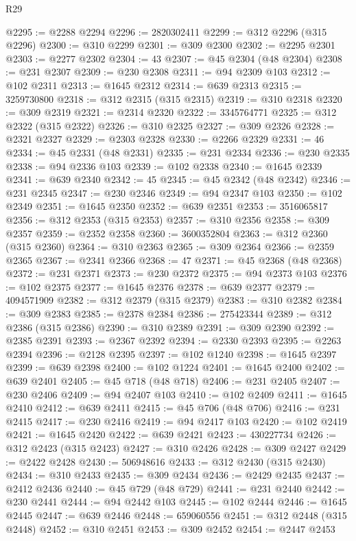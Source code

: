 \begin{lexlean}{R29}
\begin{coremodule}
@2295 := @2288 @2294
@2296 := 2820302411
@2299 := @312 @2296 (@315 @2296)
@2300 := @310 @2299
@2301 := @309 @2300
@2302 := @2295 @2301
@2303 := @2277 @2302
@2304 := 43
@2307 := @45 @2304 (@48 @2304)
@2308 := @231 @2307
@2309 := @230 @2308
@2311 := @94 @2309 @103
@2312 := @102 @2311
@2313 := @1645 @2312
@2314 := @639 @2313
@2315 := 3259730800
@2318 := @312 @2315 (@315 @2315)
@2319 := @310 @2318
@2320 := @309 @2319
@2321 := @2314 @2320
@2322 := 3345764771
@2325 := @312 @2322 (@315 @2322)
@2326 := @310 @2325
@2327 := @309 @2326
@2328 := @2321 @2327
@2329 := @2303 @2328
@2330 := @2266 @2329
@2331 := 46
@2334 := @45 @2331 (@48 @2331)
@2335 := @231 @2334
@2336 := @230 @2335
@2338 := @94 @2336 @103
@2339 := @102 @2338
@2340 := @1645 @2339
@2341 := @639 @2340
@2342 := 45
@2345 := @45 @2342 (@48 @2342)
@2346 := @231 @2345
@2347 := @230 @2346
@2349 := @94 @2347 @103
@2350 := @102 @2349
@2351 := @1645 @2350
@2352 := @639 @2351
@2353 := 3516065817
@2356 := @312 @2353 (@315 @2353)
@2357 := @310 @2356
@2358 := @309 @2357
@2359 := @2352 @2358
@2360 := 3600352804
@2363 := @312 @2360 (@315 @2360)
@2364 := @310 @2363
@2365 := @309 @2364
@2366 := @2359 @2365
@2367 := @2341 @2366
@2368 := 47
@2371 := @45 @2368 (@48 @2368)
@2372 := @231 @2371
@2373 := @230 @2372
@2375 := @94 @2373 @103
@2376 := @102 @2375
@2377 := @1645 @2376
@2378 := @639 @2377
@2379 := 4094571909
@2382 := @312 @2379 (@315 @2379)
@2383 := @310 @2382
@2384 := @309 @2383
@2385 := @2378 @2384
@2386 := 275423344
@2389 := @312 @2386 (@315 @2386)
@2390 := @310 @2389
@2391 := @309 @2390
@2392 := @2385 @2391
@2393 := @2367 @2392
@2394 := @2330 @2393
@2395 := @2263 @2394
@2396 := @2128 @2395
@2397 := @102 @1240
@2398 := @1645 @2397
@2399 := @639 @2398
@2400 := @102 @1224
@2401 := @1645 @2400
@2402 := @639 @2401
@2405 := @45 @718 (@48 @718)
@2406 := @231 @2405
@2407 := @230 @2406
@2409 := @94 @2407 @103
@2410 := @102 @2409
@2411 := @1645 @2410
@2412 := @639 @2411
@2415 := @45 @706 (@48 @706)
@2416 := @231 @2415
@2417 := @230 @2416
@2419 := @94 @2417 @103
@2420 := @102 @2419
@2421 := @1645 @2420
@2422 := @639 @2421
@2423 := 430227734
@2426 := @312 @2423 (@315 @2423)
@2427 := @310 @2426
@2428 := @309 @2427
@2429 := @2422 @2428
@2430 := 506948616
@2433 := @312 @2430 (@315 @2430)
@2434 := @310 @2433
@2435 := @309 @2434
@2436 := @2429 @2435
@2437 := @2412 @2436
@2440 := @45 @729 (@48 @729)
@2441 := @231 @2440
@2442 := @230 @2441
@2444 := @94 @2442 @103
@2445 := @102 @2444
@2446 := @1645 @2445
@2447 := @639 @2446
@2448 := 659060556
@2451 := @312 @2448 (@315 @2448)
@2452 := @310 @2451
@2453 := @309 @2452
@2454 := @2447 @2453

\end{coremodule}
\end{lexlean}
